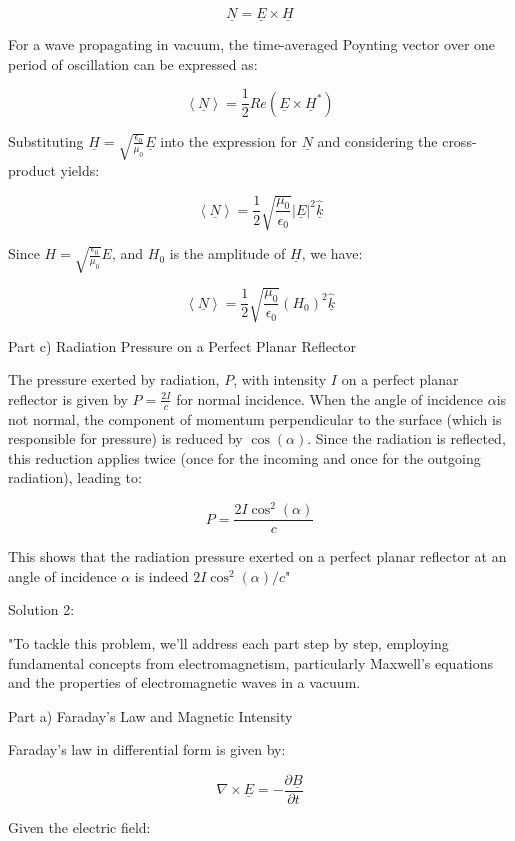 \[
\underline{N} = \underline{E} \times \underline{H}
\]

For a wave propagating in vacuum, the time-averaged Poynting vector over one period of oscillation can be expressed as:

\[
\left< \underline{N} \right> = \frac{1}{2} Re(\underline{E} \times \underline{H}^{*})
\]

Substituting \(\underline{H} = \sqrt{\frac{\epsilon_{0}}{\mu_{0}}} \underline{E}\) into the expression for \(\underline{N}\) and considering the cross-product yields:

\[
\left< \underline{N} \right> = \frac{1}{2} \sqrt{\frac{\mu_{0}}{\epsilon_{0}}} \left| \underline{E} \right|^2 \hat{\underline{k}}
\]

Since \(H = \sqrt{\frac{\epsilon_{0}}{\mu_{0}}} E\), and \(H_{0}\) is the amplitude of \(\underline{H}\), we have:

\[
\left< \underline{N} \right> = \frac{1}{2} \sqrt{\frac{\mu_{0}}{\epsilon_{0}}} (H_{0})^{2} \hat{\underline{k}}
\]

Part c) Radiation Pressure on a Perfect Planar Reflector

The pressure exerted by radiation, \( P\), with intensity \(I\) on a perfect planar reflector is given by \(P=\frac{2I}{c}\) for normal incidence. When the angle of incidence \(\alpha\)is not normal, the component of momentum perpendicular to the surface (which is responsible for pressure) is reduced by \(\cos(\alpha)\). Since the radiation is reflected, this reduction applies twice (once for the incoming and once for the outgoing radiation), leading to:

\[P = \frac{2I \cos^{2}(\alpha)}{c}\]

This shows that the radiation pressure exerted on a perfect planar reflector at an angle of incidence \(\alpha\) is indeed \(2I\cos^{2}(\alpha) / c\)"

Solution 2: 

"To tackle this problem, we'll address each part step by step, employing fundamental concepts from electromagnetism, particularly Maxwell's equations and the properties of electromagnetic waves in a vacuum.

Part a) Faraday’s Law and Magnetic Intensity

Faraday's law in differential form is given by:

\[
\nabla \times \underline{E} = -\frac{\partial \underline{B}}{\partial t}
\]

Given the electric field:

